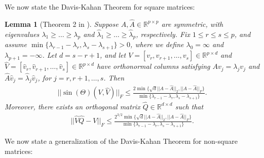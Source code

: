 \documentclass{article}
\newtheorem{lemma}{Lemma}
\begin{document}
We now state the Davis-Kahan Theorem for square matrices:

\begin{lemma}[Theorem 2 in \cite{YuEtal15}]
\label{lemma:thm3YuEtal_square}
Suppose $A, \hat{A} \in \mathbb{R}^{p \times p}$ are symmetric, with eigenvalues $\lambda_1 \geq \dots \geq \lambda_p$ and $\hat{\lambda}_1 \geq \dots \geq \hat{\lambda}_p$, respectively. Fix $1 \leq r \leq s \leq p$, and assume $\min\{\lambda_{r - 1} - \lambda_r, \lambda_s - \lambda_{s + 1}\} > 0$, where we define $\lambda_0 = \infty$ and $\lambda_{p + 1} = -\infty$. Let $d = s - r + 1$, and let $V = [v_r, v_{r + 1}, \dots, v_s] \in \mathbb{R}^{p \times d}$ and $\hat{V} = [\hat{v}_r, \hat{v}_{r + 1}, \dots, \hat{v}_s] \in \mathbb{R}^{p \times d}$ have orthonormal columns satisfying $Av_j = \lambda_jv_j$ and $\hat{A}\hat{v}_j = \hat{\lambda}_j\hat{v}_j$, for $j = r, r + 1, \dots, s$. Then
\begin{align*}
||\sin(\Theta)(V, \hat{V})||_F \leq \frac{2\min\{\sqrt{d}||A - \hat{A}||_2, ||A - \hat{A}||_F\}}{\min\{\lambda_{r - 1} - \lambda_r, \lambda_s - \lambda_{s + 1}\}}.
\end{align*}
Moreover, there exists an orthogonal matrix $\hat{Q} \in \mathbb{R}^{d \times d}$ such that
\begin{align*}
||\hat{V}\hat{Q} - V||_F \leq \frac{2^{3/2}\min\{\sqrt{d}||A - \hat{A}||_2, ||A - \hat{A}||_F\}}{\min\{\lambda_{r - 1} - \lambda_r, \lambda_s - \lambda_{s + 1}\}}.
\end{align*}
\end{lemma}

We now state a generalization of the Davis-Kahan Theorem for non-square matrices:
\end{document}
